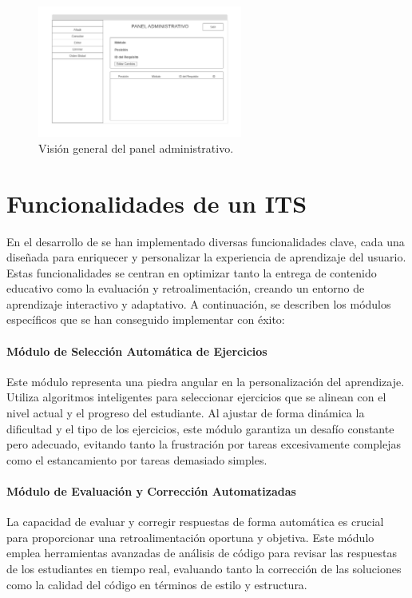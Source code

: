 \begin{figure}[H]
    \centering
    \includegraphics[width=0.6\textwidth]{imagenes/Mockups/16-Panel-Administrativo.png}
    \caption{Visión general del panel administrativo.}
\end{figure}

\section{Funcionalidades de un ITS}

En el desarrollo de se han implementado diversas funcionalidades clave, cada una diseñada para enriquecer y personalizar la experiencia de aprendizaje del usuario. Estas funcionalidades se centran en optimizar tanto la entrega de contenido educativo como la evaluación y retroalimentación, creando un entorno de aprendizaje interactivo y adaptativo. A continuación, se describen los módulos específicos que se han conseguido implementar con éxito:

\paragraph{Módulo de Selección Automática de Ejercicios}

Este módulo representa una piedra angular en la personalización del aprendizaje. Utiliza algoritmos inteligentes para seleccionar ejercicios que se alinean con el nivel actual y el progreso del estudiante. Al ajustar de forma dinámica la dificultad y el tipo de los ejercicios, este módulo garantiza un desafío constante pero adecuado, evitando tanto la frustración por tareas excesivamente complejas como el estancamiento por tareas demasiado simples.

\paragraph{Módulo de Evaluación y Corrección Automatizadas}

La capacidad de evaluar y corregir respuestas de forma automática es crucial para proporcionar una retroalimentación oportuna y objetiva. Este módulo emplea herramientas avanzadas de análisis de código para revisar las respuestas de los estudiantes en tiempo real, evaluando tanto la corrección de las soluciones como la calidad del código en términos de estilo y estructura.

